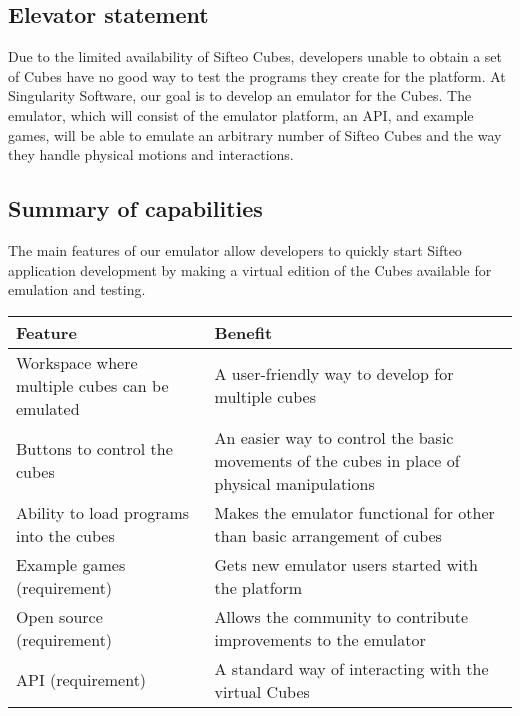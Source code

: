 \documentclass[12pt]{article}
\begin{document}
              \subsection{Elevator statement}
              Due to the limited availability of Sifteo Cubes, developers unable to obtain a set of Cubes have no good way to test the programs they create for the platform. At Singularity Software, our goal is to develop an emulator for the Cubes. The emulator, which will consist of the emulator platform, an API, and example games, will be able to emulate an arbitrary number of Sifteo Cubes and the way they handle physical motions and interactions.
\clearpage
              \subsection{Summary of capabilities}
              The main features of our emulator allow developers to quickly start Sifteo application development by making a virtual edition of the Cubes available for emulation and testing.
              \begin{table}[h]
                \begin{tabular}{p{3in} | p{3in}}
                  \textbf{Feature} & \textbf{Benefit} \\ \hline
                  Workspace where multiple cubes can be emulated
                            & A user-friendly way to develop for multiple cubes \\ \hline
                  Buttons to control the cubes
                            & An easier way to control the basic movements of the cubes in place of physical manipulations \\ \hline
                  Ability to load programs into the cubes
                            & Makes the emulator functional for other than basic arrangement of cubes \\ \hline
                  Example games (requirement)
                            & Gets new emulator users started with the platform \\ \hline
                  Open source\index{Open source}  (requirement)
                            & Allows the community to contribute improvements to the emulator \\ \hline
                  API\index{API} (requirement)
                            & A standard way of interacting with the virtual Cubes
                \end{tabular}
              \end{table}
\end{document}
